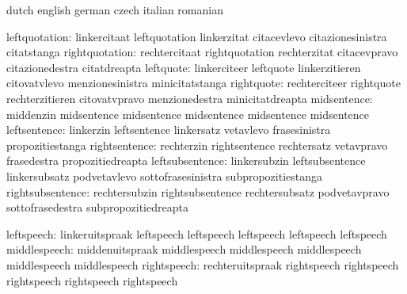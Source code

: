 
\startconstants            dutch                     english
                           german                    czech
                           italian                   romanian

            leftquotation: linkercitaat              leftquotation
                           linkerzitat               citacevlevo
                           citazionesinistra         citatstanga
           rightquotation: rechtercitaat             rightquotation
                           rechterzitat              citacevpravo
                           citazionedestra           citatdreapta
                leftquote: linkerciteer              leftquote
                           linkerzitieren            citovatvlevo
                           menzionesinistra          minicitatstanga
               rightquote: rechterciteer             rightquote
                           rechterzitieren           citovatvpravo
                           menzionedestra            minicitatdreapta
midsentence: middenzin                 midsentence
             midsentence               midsentence
             midsentence               midsentence
             leftsentence: linkerzin                 leftsentence
                           linkersatz                vetavlevo
                           frasesinistra             propozitiestanga
            rightsentence: rechterzin                rightsentence
                           rechtersatz               vetavpravo
                           frasedestra               propozitiedreapta
          leftsubsentence: linkersubzin              leftsubsentence
                           linkersubsatz             podvetavlevo
                           sottofrasesinistra        subpropozitiestanga
         rightsubsentence: rechtersubzin             rightsubsentence
                           rechtersubsatz            podvetavpravo
                           sottofrasedestra          subpropozitiedreapta

               leftspeech: linkeruitspraak           leftspeech
                           leftspeech                leftspeech
                           leftspeech                leftspeech %
             middlespeech: middenuitspraak           middlespeech
                           middlespeech              middlespeech
                           middlespeech              middlespeech %
              rightspeech: rechteruitspraak          rightspeech
                           rightspeech               rightspeech
                           rightspeech               rightspeech %


